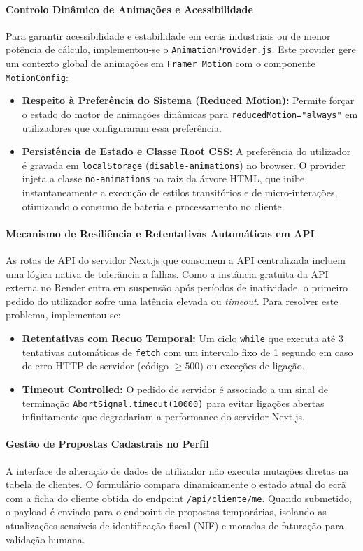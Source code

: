 \paragraph{Controlo Dinâmico de Animações e Acessibilidade}
Para garantir acessibilidade e estabilidade em ecrãs industriais ou de menor potência de cálculo, implementou-se o \texttt{AnimationProvider.js}. Este provider gere um contexto global de animações em \texttt{Framer Motion} com o componente \texttt{MotionConfig}:
\begin{itemize}
    \item \textbf{Respeito à Preferência do Sistema (Reduced Motion):} Permite forçar o estado do motor de animações dinâmicas para \texttt{reducedMotion="always"} em utilizadores que configuraram essa preferência.
    \item \textbf{Persistência de Estado e Classe Root CSS:} A preferência do utilizador é gravada em \texttt{localStorage} (\texttt{disable-animations}) no browser. O provider injeta a classe \texttt{no-animations} na raiz da árvore \ac{HTML}, que inibe instantaneamente a execução de estilos transitórios e de micro-interações, otimizando o consumo de bateria e processamento no cliente.
\end{itemize}

\paragraph{Mecanismo de Resiliência e Retentativas Automáticas em API}
As rotas de API do servidor Next.js que consomem a API centralizada incluem uma lógica nativa de tolerância a falhas. Como a instância gratuita da API externa no Render entra em suspensão após períodos de inatividade, o primeiro pedido do utilizador sofre uma latência elevada ou \textit{timeout}. Para resolver este problema, implementou-se:
\begin{itemize}
    \item \textbf{Retentativas com Recuo Temporal:} Um ciclo \texttt{while} que executa até 3 tentativas automáticas de \texttt{fetch} com um intervalo fixo de 1 segundo em caso de erro HTTP de servidor (código $\ge 500$) ou exceções de ligação.
    \item \textbf{Timeout Controlled:} O pedido de servidor é associado a um sinal de terminação \texttt{AbortSignal.timeout(10000)} para evitar ligações abertas infinitamente que degradariam a performance do servidor Next.js.
\end{itemize}

\paragraph{Gestão de Propostas Cadastrais no Perfil}
A interface de alteração de dados de utilizador não executa mutações diretas na tabela de clientes. O formulário compara dinamicamente o estado atual do ecrã com a ficha do cliente obtida do endpoint \texttt{/api/cliente/me}. Quando submetido, o payload é enviado para o endpoint de propostas temporárias, isolando as atualizações sensíveis de identificação fiscal (NIF) e moradas de faturação para validação humana.

